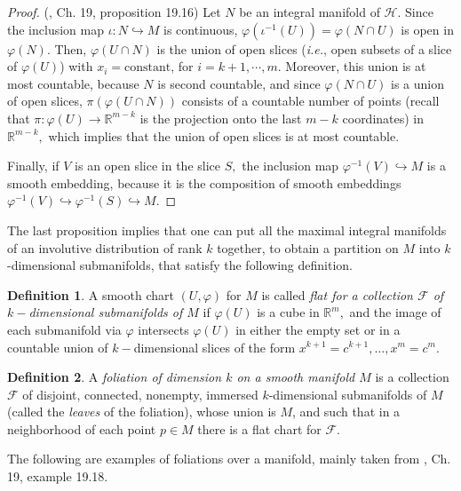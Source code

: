 \documentclass[12pt, letterpaper, reqno]{amsart}
\theoremstyle{definition}
\newtheorem{df}{Definition}
\theoremstyle{plain}
\theoremstyle{remark}
\begin{document}
\begin{proof}(\cite{lee2003introduction}, Ch. 19, proposition 19.16)
	Let $ N $ be an integral manifold of $ \mathcal{H}. $ Since the inclusion map $ \iota: N \hookrightarrow M $ is continuous, $ \varphi( \iota^{-1}(U))=\varphi(N\cap U) $  is open in $ \varphi(N) $. Then, $ \varphi(U\cap N) $ is the union of open slices (\textit{i.e.}, open subsets of a slice of $ \varphi(U)$) with $ x_i=\text{constant} $, for $ i=k+1,\cdots,m.$ Moreover, this union is at most countable, because $ N $ is second countable, and since $ \varphi(N\cap U) $ is a union of open slices, $ \pi(\varphi(U\cap N)) $ consists of a countable number of points (recall that $ \pi: \varphi(U) \rightarrow \mathbb{R}^{m-k} $ is the projection onto the last $ m-k $ coordinates) in $ \mathbb{R}^{m-k}, $ which implies that the union of open slices is at most countable.  

	Finally, if $ V $ is an open slice in the slice $ S, $ the inclusion map $ \varphi^{-1}(V) \hookrightarrow M $ is a smooth embedding, because it is the composition of smooth embeddings $ \varphi^{-1}(V)\hookrightarrow \varphi^{-1}(S) \hookrightarrow M.$ 
\end{proof}

The last proposition implies that one can put all the maximal integral manifolds of an involutive distribution of rank $ k $  together, to obtain a partition on $ M $ into $ k $-dimensional submanifolds, that satisfy the following definition.
\begin{df}
	A smooth chart $ (U,\varphi) $ for $ M $ is called \textit{flat for a collection $ \mathcal{F} $ of $ k- $dimensional submanifolds of $ M $} if $ \varphi(U) $ is a cube in $ \mathbb{R}^m, $ and the image of each submanifold via $ \varphi $ intersects $ \varphi(U) $ in either the empty set or in a countable union of $ k- $dimensional slices of the form $ x^{k+1}=c^{k+1},\dots,x^m=c^m. $   
\end{df}

\begin{df}
	A \textit{foliation of dimension $ k $ on a smooth manifold $ M $} is a collection $ \mathcal{F} $ of disjoint, connected, nonempty, immersed $ k $-dimensional submanifolds of $ M $ (called the \textit{leaves} of the foliation), whose union is $ M $, and such that in a neighborhood of each point $ p\in M $ there is a flat chart for $ \mathcal{F}. $  
\end{df}

The following are examples of foliations over a manifold, mainly taken from \cite{lee2003introduction}, Ch. 19, example 19.18.
\end{document}
